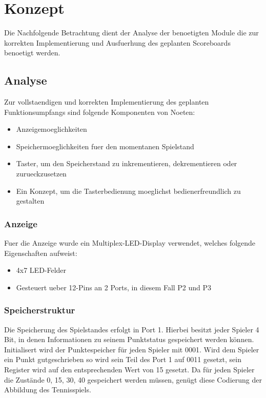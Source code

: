 \chapter{Konzept}
Die Nachfolgende Betrachtung dient der Analyse der benoetigten Module die zur korrekten Implementierung und Ausfuerhung des geplanten Scoreboards benoetigt werden.\\

\section{Analyse}
Zur vollstaendigen und korrekten Implementierung des geplanten Funktionsumpfangs sind folgende Komponenten von Noeten:
\begin{itemize}
	\item Anzeigemoeglichkeiten
	\item Speichermoeglichkeiten fuer den momentanen Spielstand
	\item Taster, um den Speicherstand zu inkrementieren, dekrementieren oder zurueckzusetzen
	\item Ein Konzept, um die Tasterbedienung moeglichst bedienerfreundlich zu gestalten
\end{itemize}

\subsection{Anzeige}
Fuer die Anzeige wurde ein Multiplex-LED-Display verwendet, welches folgende Eigenschaften aufweist:
\begin{itemize}
	\item 4x7 LED-Felder
	\item Gesteuert ueber 12-Pins an 2 Ports, in diesem Fall P2 und P3
\end{itemize}

\subsection{Speicherstruktur}
Die Speicherung des Spielstandes erfolgt in Port 1. Hierbei besitzt jeder Spieler 4 Bit, in denen Informationen zu seinem Punktstatus gespeichert werden können. Initialisert wird der Punktespeicher für jeden Spieler mit 0001. Wird dem Spieler ein Punkt gutgeschrieben so wird sein Teil des Port 1 auf 0011 gesetzt, sein Register wird auf den entsprechenden Wert von 15 gesetzt. Da für jeden Spieler die Zustände 0, 15, 30, 40 gespeichert werden müssen, genügt diese Codierung der Abbildung des Tennisspiels. 

